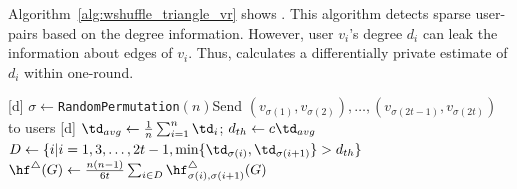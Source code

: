 Algorithm~\ref{alg:wshuffle_triangle_vr} shows \AlgWSTriVR{}. 
This algorithm detects sparse user-pairs based on the degree information. 
However, user $v_i$'s degree $d_i$ can leak the information about edges of $v_i$. 
Thus, \AlgWSTriVR{} calculates a differentially private estimate of $d_i$ within one-round. 

\setlength{\algomargin}{5mm}
\begin{algorithm}[t]
  \SetAlgoLined
  [d] $\sigma \leftarrow$\texttt{RandomPermutation}$(n)$\;
  [d] Send $(v_{\sigma(1)}, v_{\sigma(2)}), \ldots, (v_{\sigma(2t-1)}, v_{\sigma(2t)})$ to users\;
  [d] $\td_{avg} \leftarrow \frac{1}{n} \sum_{i=1}^n \td_i$; $d_{th} \leftarrow c \td_{avg}$\;
  [d] $D \leftarrow \{i | i = 1, 3, \ldots, 2t-1, 
  \min\{\td_{\sigma(i)}, \td_{\sigma(i+1)}\} > d_{th}\}$\;
  [d] $\hf^\triangle(G) \leftarrow \frac{n(n-1)}{6t} \sum_{i \in D} \hf_{\sigma(i),\sigma(i+1)}^\triangle(G)$\;
  \caption{Our triangle counting algorithm with variance reduction \AlgWSTriVR{}.
  \AlgWSLE{} is shown in Algorithm~\ref{alg:WSLE}. 
  }\label{alg:wshuffle_triangle_vr}
\end{algorithm}


